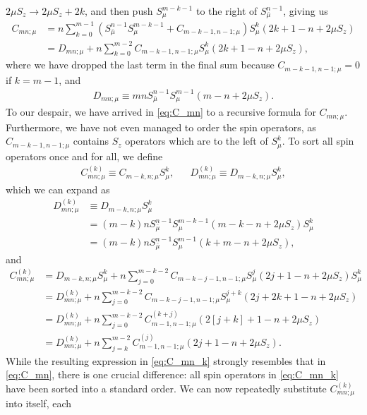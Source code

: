\documentclass[aps,notitlepage,nofootinbib,11pt]{revtex4-1}
\newcommand{\p}[1]{\left(#1\right)} %
\renewcommand{\sp}[1]{\left[#1\right]} %
\newcommand{\bmu}{{\bar\mu}}
\newcommand{\1}{\mathds{1}}
\begin{document}
$2\mu S_z\to 2\mu S_z+2k$, and then push $S_\mu^{m-k-1}$ to the right
of $S_\bmu^{n-1}$, giving us
\begin{align}
  C_{mn;\mu}
  &= n \sum_{k=0}^{m-1}
  \p{S_\bmu^{n-1} S_\mu^{m-k-1} + C_{m-k-1,n-1;\mu}} S_\mu^k
  \p{2k + 1 - n + 2\mu S_z} \\
  &= D_{mn;\mu}
  + n \sum_{k=0}^{m-2} C_{m-k-1,n-1;\mu}
  S_\mu^k \p{2k + 1 - n + 2\mu S_z},
  \label{eq:C_mn}
\end{align}
where we have dropped the last term in the final sum because
$C_{m-k-1,n-1;\mu}=0$ if $k=m-1$, and
\begin{align}
  D_{mn;\mu}
  \equiv mn S_\bmu^{n-1} S_\mu^{m-1} \p{m - n + 2\mu S_z}.
  \label{eq:D_mn}
\end{align}
To our despair, we have arrived in \eqref{eq:C_mn} to a recursive
formula for $C_{mn;\mu}$.  Furthermore, we have not even managed to
order the spin operators, as $C_{m-k-1,n-1;\mu}$ contains $S_z$
operators which are to the left of $S_\mu^k$.  To sort all spin
operators once and for all, we define
\begin{align}
  C_{mn;\mu}^{(k)} \equiv C_{m-k,n;\mu} S_\mu^k,
  &&
  D_{mn;\mu}^{(k)} \equiv D_{m-k,n;\mu} S_\mu^k,
\end{align}
which we can expand as
\begin{align}
  D_{mn;\mu}^{(k)}
  &\equiv D_{m-k,n;\mu}S_\mu^k \\
  &= \p{m-k}n S_\bmu^{n-1} S_\mu^{m-k-1}
  \p{m-k-n+2\mu S_z} S_\mu^k \\
  &= \p{m-k}n S_\bmu^{n-1} S_\mu^{m-1} \p{k+m-n+2\mu S_z},
  \label{eq:D_mn_k}
\end{align}
and
\begin{align}
  C_{mn;\mu}^{(k)}
  &= D_{m-k,n;\mu} S_\mu^k + n \sum_{j=0}^{m-k-2}
  C_{m-k-j-1,n-1;\mu} S_\mu^j \p{2j+1-n+2\mu S_z} S_\mu^k \\
  &= D_{mn;\mu}^{(k)} + n \sum_{j=0}^{m-k-2}
  C_{m-k-j-1,n-1;\mu} S_\mu^{j+k} \p{2j+2k+1-n+2\mu S_z} \\
  &= D_{mn;\mu}^{(k)} + n \sum_{j=0}^{m-k-2}
  C_{m-1,n-1;\mu}^{(k+j)} \p{2\sp{j+k}+1-n+2\mu S_z} \\
  &= D_{mn;\mu}^{(k)} + n \sum_{j=k}^{m-2}
  C_{m-1,n-1;\mu}^{(j)} \p{2j+1-n+2\mu S_z}.
  \label{eq:C_mn_k}
\end{align}
While the resulting expression in \eqref{eq:C_mn_k} strongly resembles
that in \eqref{eq:C_mn}, there is one crucial difference: all spin
operators in \eqref{eq:C_mn_k} have been sorted into a standard order.
We can now repeatedly substitute $C_{mn;\mu}^{(k)}$ into itself, each
\end{document}
